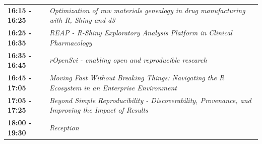 \documentclass[]{book}
\theoremstyle{definition}
\theoremstyle{definition}
\theoremstyle{definition}
\theoremstyle{remark}
\begin{document}
\begin{longtable}[]{@{}ll@{}}
\begin{minipage}[t]{0.47\columnwidth}\raggedright
\textbf{16:15 - 16:25}\strut
\end{minipage} & \begin{minipage}[t]{0.47\columnwidth}\raggedright
\emph{Optimization of raw materials genealogy in drug manufacturing with
R, Shiny and d3}\strut
\end{minipage}\tabularnewline
\begin{minipage}[t]{0.47\columnwidth}\raggedright
\textbf{16:25 - 16:35}\strut
\end{minipage} & \begin{minipage}[t]{0.47\columnwidth}\raggedright
\emph{REAP - R-Shiny Exploratory Analysis Platform in Clinical
Pharmacology}\strut
\end{minipage}\tabularnewline
\begin{minipage}[t]{0.47\columnwidth}\raggedright
\textbf{16:35 - 16:45}\strut
\end{minipage} & \begin{minipage}[t]{0.47\columnwidth}\raggedright
\emph{rOpenSci - enabling open and reproducible research}\strut
\end{minipage}\tabularnewline
\begin{minipage}[t]{0.47\columnwidth}\raggedright
\textbf{16:45 - 17:05}\strut
\end{minipage} & \begin{minipage}[t]{0.47\columnwidth}\raggedright
\emph{Moving Fast Without Breaking Things: Navigating the R Ecosystem in
an Enterprise Environment}\strut
\end{minipage}\tabularnewline
\begin{minipage}[t]{0.47\columnwidth}\raggedright
\textbf{17:05 - 17:25}\strut
\end{minipage} & \begin{minipage}[t]{0.47\columnwidth}\raggedright
\emph{Beyond Simple Reproducibility - Discoverability, Provenance, and
Improving the Impact of Results}\strut
\end{minipage}\tabularnewline
\begin{minipage}[t]{0.47\columnwidth}\raggedright
\textbf{18:00 - 19:30}\strut
\end{minipage} & \begin{minipage}[t]{0.47\columnwidth}\raggedright
\emph{Reception}\strut
\end{minipage}\tabularnewline
\bottomrule
\end{longtable}
\end{document}
